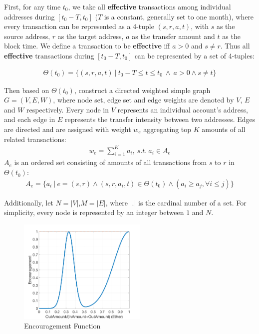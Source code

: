 First, for any time $t_0$, we take all \textbf{effective} transactions among individual addresses during $[t_0- T, t_0]$ ($T$ is a constant, generally set to one month), where every transaction can be represented as a 4-tuple $(s,r,a,t)$, with $s$ as the source address, $r$ as the target address, $a$ as the transfer amount and $t$ as the block time. We define a transaction to be \textbf{effective} iff $a>0$ and $s \neq r	$. Thus all \textbf{effective} transactions during $[t_0- T, t_0]$ can be represented by a set of 4-tuples:

\begin{align}
\Theta(t_0) = \{(s, r, a, t)\ |\ t_0 - T \le t \le t_0\ \land \ a > 0 \land s \neq t \}
\end{align}

Then based on $\Theta(t_0)$, construct a directed weighted simple graph $G=(V,E, W)$, where node set, edge set and edge weights are denoted by $V$, $E$ and $W$ respectively. Every node in $V$ represents an individual account's address, and each edge in $E$ represents the transfer intensity between two addresses. Edges are directed and are assigned with weight $w_e$ aggregating top $K$ amounts of all related transactions:
\begin{align}\label{formula:edgeweight}
w_e = \sum_{i=1}^K a_i,\ s.t.\ a_i \in A_e
\end{align}
$A_e$ is an ordered set consisting of amounts of all transactions from $s$ to $r$ in $\Theta(t_0)$:
\begin{align}
A_e = \{a_i\ |\ e = (s,r) \land (s, r, a_i, t) \in \Theta(t_0) \land (a_i \ge a_j, \forall i \le j) \}
\end{align}

Additionally, let $N = |V|$,$M = |E|$, where $|.|$ is the cardinal number of a set. For simplicity, every node is represented by an integer between $1$ and $N$.

\begin{figure}[h]
\centering
	\includegraphics[width=0.55\textwidth]{figs/encouragement_en.png}
	\caption{Encouragement Function}\label{fig:encouragement}
\end{figure}

